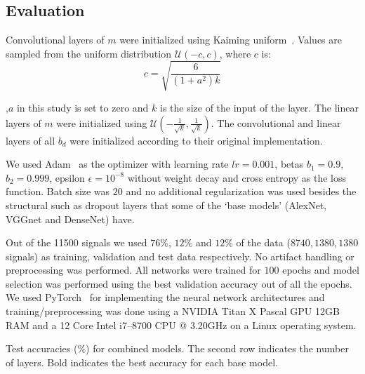 \documentclass[conference]{IEEEtran}
\providecommand{\FILEPATH}{.}
\begin{document}
\subsection{Evaluation}
Convolutional layers of $m$ were initialized using Kaiming
uniform~\cite{he2015delving}. Values are sampled from the uniform
distribution $\mathcal{U}(-c, c)$, where $c$ is:
\begin{equation}
  c = \sqrt{\frac{6}{(1 + a^2) k}}
\end{equation}

\noindent
,$a$ in this study is set to zero and $k$ is the size of the input of the layer.
The linear layers of $m$ were initialized using
$\mathcal{U}(-\frac{1}{\sqrt{k}},\frac{1}{\sqrt{k}})$.
The convolutional and linear layers of all $b_d$ were initialized
according to their original implementation.

We used Adam~\cite{kingma2014adam} as the optimizer with learning
rate $lr=0.001$, betas $b_1=0.9$, $b_2=0.999$, epsilon
$\epsilon=10^{-8}$ without weight decay and cross entropy as the loss function.
Batch size was $20$ and no additional regularization was used besides
the structural such as dropout layers that some of the `base models'
(AlexNet, VGGnet and DenseNet) have.

Out of the 11500 signals we used $76\%$, $12\%$ and $12\%$ of the
data ($8740,1380,1380$ signals) as training, validation and test data
respectively.
No artifact handling or preprocessing was performed.
All networks were trained for $100$ epochs and model selection was
performed using the best validation accuracy out of all the epochs.
We used PyTorch~\cite{paszke2017automatic} for implementing the
neural network architectures and training/preprocessing was done
using a NVIDIA Titan X Pascal GPU 12GB RAM and a 12 Core Intel
i7--8700 CPU @ 3.20GHz on a Linux operating system.

\begin{table}[!t]
  \caption{Test accuracies (\%) for combined models.
    The second row indicates the number of layers.
  Bold indicates the best accuracy for each base model.}\label{table:results}
  \begin{adjustbox}{width=\textwidth}
    
  \end{adjustbox}
\end{table}
\end{document}
